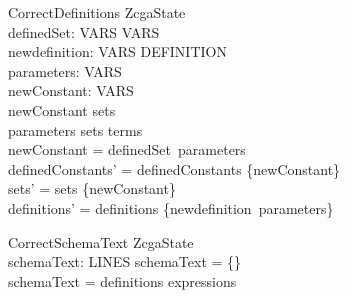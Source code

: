 \documentclass{article}
\begin{document}
\begin{schema}{CorrectDefinitions}
\Delta ZcgaState \\
definedSet: \power VARS \pfun VARS \\
newdefinition: \power VARS \pfun DEFINITION \\
parameters: \power VARS \\
newConstant: VARS \\
\where
newConstant \notin sets \\
parameters \subseteq sets \cup terms \\
newConstant = definedSet~parameters \\
definedConstants' = definedConstants \cup \{newConstant\} \\
sets' = sets \cup \{newConstant\} \\
definitions' = definitions \cup \{newdefinition~parameters\}
\end{schema}

\begin{schema}{CorrectSchemaText}
\Xi ZcgaState \\
schemaText: \power LINES
\where
schemaText = \{\} \lor \\
schemaText = definitions \cup expressions
\end{schema}
\end{document}
